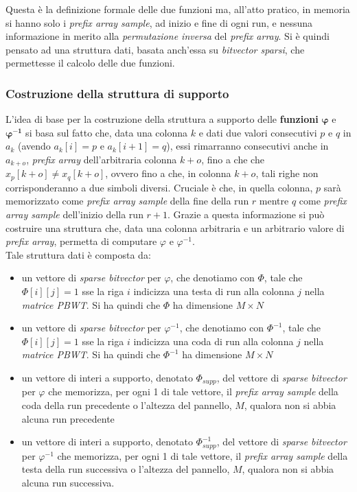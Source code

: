 Questa è la definizione formale delle due funzioni ma, all'atto pratico, in
memoria si hanno solo i \textit{prefix array sample}, ad inizio e fine di ogni
run, e nessuna informazione in merito alla \textit{permutazione inversa} del
\textit{prefix array}. Si è quindi pensato ad una struttura dati, basata
anch'essa su \textit{bitvector sparsi}, che permettesse il calcolo delle due
funzioni. 
\subsubsection{Costruzione della struttura di supporto}
L'idea di base per la costruzione della struttura a supporto delle
\textbf{funzioni} $\boldsymbol\varphi$ e $\boldsymbol\varphi\mathbf{^{-1}}$ si
basa sul fatto che, data una colonna $k$ e dati due valori consecutivi $p$ e $q$
in $a_k$ (avendo $a_k[i]=p$ e $a_k[i+1]=q$), essi rimarranno consecutivi anche
in $a_{k+o}$, \textit{prefix array} dell'arbitraria colonna $k+o$, fino a che
che $x_{p}[k+o]\neq x_{q}[k+o]$, ovvero fino a che, in colonna $k+o$, tali righe
non corrisponderanno a due simboli diversi. Cruciale è che, in quella colonna,
$p$ sarà memorizzato come \textit{prefix array sample} della fine della run $r$
mentre $q$ come \textit{prefix array sample} dell'inizio della run $r+1$. Grazie
a questa informazione si può costruire una struttura che, data una colonna
arbitraria e un arbitrario valore di \textit{prefix array}, permetta di
computare $\varphi$ e $\varphi^{-1}$.\\
Tale struttura dati è composta da:
\begin{itemize}
  \item un vettore di \textit{sparse bitvector} per $\varphi$, che denotiamo con
  $\varPhi$, tale che $\varPhi[i][j]=1$ sse la riga $i$ indicizza una testa di
  run alla colonna $j$ nella \textit{matrice PBWT}. Si ha quindi che $\varPhi$
  ha dimensione $M\times N$
  \item un vettore di \textit{sparse bitvector} per $\varphi^{-1}$, che
  denotiamo con $\varPhi^{-1}$, tale che $\varPhi[i][j]=1$ sse la riga $i$
  indicizza una coda di run alla colonna $j$ nella \textit{matrice PBWT}. Si ha
  quindi che $\varPhi^{-1}$ ha dimensione $M\times N$
  \item un vettore di interi a supporto, denotato $\varPhi_{supp}$, del vettore
  di \textit{sparse bitvector} 
  per $\varphi$ che memorizza, per ogni 1 di tale vettore, il
  \textit{prefix array sample} della coda della run precedente o l'altezza
  del pannello, $M$, qualora non si abbia alcuna run precedente
  \item un vettore di interi a supporto, denotato $\varPhi^{-1}_{supp}$, del
  vettore di \textit{sparse bitvector} 
  per $\varphi^{-1}$ che memorizza, per ogni 1 di tale vettore,
  il \textit{prefix array sample} della testa della run successiva o l'altezza
  del pannello, $M$, qualora non si abbia alcuna run successiva. 
\end{itemize}
